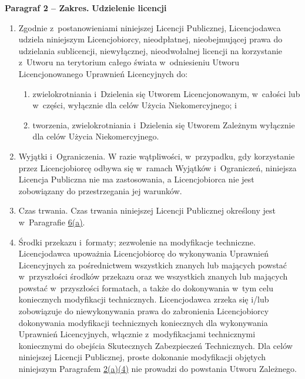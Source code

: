 \documentclass[oneside,polish,11pt,rmheadings]{mwbk}
\begin{document}
\bigskip
\textbf{Paragraf 2 – Zakres.} 
\textbf{{\textmd{Udzielenie licencji}}}

\begin{enumerate}
\item  Zgodnie z~postanowieniami niniejszej Licencji Publicznej, Licencjodawca udziela niniejszym Licencjobiorcy, nieodpłatnej, nieobejmującej prawa do udzielania sublicencji, niewyłącznej, nieodwołalnej licencji na korzystanie z~Utworu na terytorium całego świata w~odniesieniu Utworu Licencjonowanego Uprawnień Licencyjnych do:  
\begin{enumerate} \item  zwielokrotniania i~Dzielenia się Utworem Licencjonowanym, w~całości lub w~części, wyłącznie dla celów Użycia Niekomercyjnego; i~ 
\item  tworzenia, zwielokrotniania i~Dzielenia się Utworem Zależnym wyłącznie dla celów Użycia Niekomercyjnego.  
\end{enumerate} 
\item  Wyjątki i~Ograniczenia. W razie wątpliwości, w~przypadku, gdy korzystanie przez Licencjobiorcę odbywa się w~ramach Wyjątków i~Ograniczeń, niniejsza Licencja Publiczna nie ma zastosowania, a Licencjobiorca nie jest zobowiązany do przestrzegania jej warunków.  
\item  Czas trwania. Czas trwania niniejszej Licencji Publicznej określony jest w~Paragrafie \href{about:reader?url=https%3A%2F%2Fcreativecommons.org%2Flicenses%2Fby-nc-sa%2F4.0%2Flegalcode.pl#s6a}{6(a)}.  
\item  Środki przekazu i~formaty; zezwolenie na modyfikacje techniczne. Licencjodawca upoważnia Licencjobiorcę do wykonywania Uprawnień Licencyjnych za pośrednictwem wszystkich znanych lub mających powstać w~przyszłości środków przekazu oraz we wszystkich znanych lub mających powstać w~przyszłości formatach, a także do dokonywania w~tym celu koniecznych modyfikacji technicznych. Licencjodawca zrzeka się i/lub zobowiązuje do niewykonywania prawa do zabronienia Licencjobiorcy dokonywania modyfikacji technicznych koniecznych dla wykonywania Uprawnień Licencyjnych, włącznie z~modyfikacjami technicznymi koniecznymi do obejścia Skutecznych Zabezpieczeń Technicznych. Dla celów niniejszej Licencji Publicznej, proste dokonanie modyfikacji objętych niniejszym Paragrafem \href{about:reader?url=https%3A%2F%2Fcreativecommons.org%2Flicenses%2Fby-nc-sa%2F4.0%2Flegalcode.pl#s2a4}{2(a)(4)} 
nie prowadzi do powstania Utworu Zależnego.  


\end{enumerate}
\end{document}
